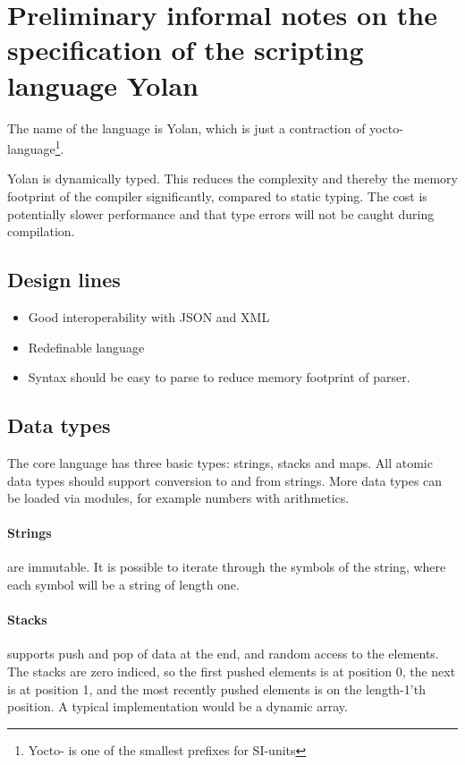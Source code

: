 \section{Preliminary informal notes on the specification of the scripting language Yolan}
The name of the language is Yolan, which is just a contraction of
yocto-language\footnote{Yocto- is one of the smallest prefixes for SI-units}.

Yolan is dynamically typed. 
This reduces the complexity and thereby the memory footprint of the compiler significantly, compared to static typing. 
The cost is potentially slower performance and that type errors will not be caught during compilation.

\subsection{Design lines}

\begin{itemize}
\item Good interoperability with JSON and XML
\item Redefinable language
\item Syntax should be easy to parse to reduce memory footprint of parser.
\end{itemize}

\subsection{Data types}

The core language has three basic types: strings, stacks and maps.
All atomic data types should support conversion to and from strings.
More data types can be loaded via modules, for example numbers with arithmetics. 
\paragraph{Strings} are immutable. 
It is possible to iterate through the symbols of the string, where each symbol will be a string of length one.

\paragraph{Stacks} supports push and pop of data at the end, and random access to the elements. The stacks are zero indiced, so the first pushed elements is at position 0, the next is at position 1, and the most recently pushed elements is on the length-1'th position. A typical implementation would be a dynamic array.

